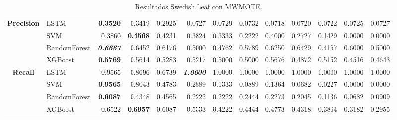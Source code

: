 \begin{table}[H]
\begin{adjustbox}{max width=12cm}
\begin{tabular}{|c|l|r|r|r|r|r|r|r|r|r|r|r|}
		\hline
		\textbf{Precision} &  LSTM & \textbf{  0.3520 } &  0.3419 &  0.2925 &  0.0727 &  0.0729 &  0.0732 &  0.0718 &  0.0720 &  0.0722 &  0.0725 &  0.0727 \\
		&  SVM &  0.3860 & \textbf{  0.4568 } &  0.4231 &  0.3824 &  0.3333 &  0.2222 &  0.4000 &  0.2727 &  0.1429 &  0.0000 &  0.0000 \\
		&  RandomForest & \textit{ \textbf{  0.6667 } } &  0.6452 &  0.6176 &  0.5000 &  0.4762 &  0.5789 &  0.6250 &  0.6429 &  0.4167 &  0.6000 &  0.5000 \\
		&  XGBoost & \textbf{  0.5769 } &  0.5614 &  0.5283 &  0.5217 &  0.5000 &  0.5000 &  0.5676 &  0.4872 &  0.5152 &  0.4516 &  0.4643 \\
		\hline
		\textbf{Recall} &  LSTM &  0.9565 &  0.8696 &  0.6739 & \textit{ \textbf{  1.0000 } } &  1.0000 &  1.0000 &  1.0000 &  1.0000 &  1.0000 &  1.0000 &  1.0000 \\
		&  SVM & \textbf{  0.9565 } &  0.8043 &  0.4783 &  0.2889 &  0.1333 &  0.0889 &  0.1364 &  0.0682 &  0.0227 &  0.0000 &  0.0000 \\
		&  RandomForest & \textbf{  0.6087 } &  0.4348 &  0.4565 &  0.2222 &  0.2222 &  0.2444 &  0.2273 &  0.2045 &  0.1136 &  0.0682 &  0.0909 \\
		&  XGBoost &  0.6522 & \textbf{  0.6957 } &  0.6087 &  0.5333 &  0.4222 &  0.4444 &  0.4773 &  0.4318 &  0.3864 &  0.3182 &  0.2955 \\
		\hline
	\end{tabular}
\end{adjustbox}
\caption{Resultados Swedish Leaf con MWMOTE.}
\label{tab:SLeaf_MWMOTE}
\end{table}

